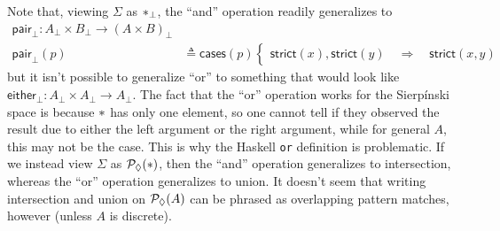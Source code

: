 Note that, viewing $\Sigma$ as $\ast_\bot$, the ``and'' operation readily generalizes to 
\begin{align*}
 \mathsf{pair}_\bot: A_\bot \times B_\bot \to \left( A \times B \right)_\bot
\\ \mathsf{pair}_\bot(p) &\triangleq \mathsf{cases}(p)
\begin{cases}
\mathsf{strict}(x) , \mathsf{strict}(y)
  \quad \Longrightarrow \quad \mathsf{strict}(x, y)
\end{cases}
\end{align*}
but it isn't possible to generalize ``or'' to something that would look like $ \mathsf{either}_\bot: A_\bot \times A_\bot \to A_\bot$. The fact that the ``or'' operation works for the Sierp\'inski space is because $\ast$ has only one element, so one cannot tell if they observed the result due to either the left argument or the right argument, while for general $A$, this may not be the case. This is why the Haskell \texttt{or} definition is problematic. If we instead view $\Sigma$ as $\mathcal{P}_\lozenge(\ast)$, then the ``and'' operation generalizes to intersection, whereas the ``or'' operation generalizes to union. It doesn't seem that writing intersection and union on $\mathcal{P}_\lozenge(A)$ can be phrased as overlapping pattern matches, however (unless $A$ is discrete).


